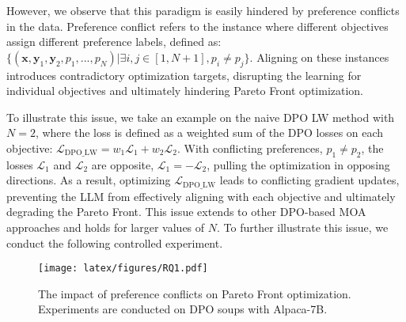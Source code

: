 However, we observe that this paradigm is easily hindered by preference conflicts in the data. 
Preference conflict refers to the instance where different objectives assign different preference labels, defined as:
$\{(\textbf{x}, \textbf{y}_1, \textbf{y}_2, p_1, ..., p_{N}) | \exists i, j \in [1, N+1],  p_i \neq p_j\}$. 
Aligning on these instances introduces contradictory optimization targets, disrupting the learning for individual objectives and ultimately hindering Pareto Front optimization. 

To illustrate this issue, we take an example on the naive DPO LW method with $N = 2$, where the loss is defined as a weighted sum of the DPO losses on each objective: $\mathcal{L}_{\mathrm{DPO\_LW}} = w_1 \mathcal{L}_1 + w_2 \mathcal{L}_2$. 
With conflicting preferences, \ie $p_1 \neq p_2$, the losses $\mathcal{L}_1$ and $\mathcal{L}_2$ are opposite, $\mathcal{L}_1 = - \mathcal{L}_2$, pulling the optimization in opposing directions. 
As a result, optimizing $\mathcal{L}_{\mathrm{DPO\_LW}}$ leads to conflicting gradient updates, preventing the LLM from effectively aligning with each objective and ultimately degrading the Pareto Front.
This issue extends to other DPO-based MOA approaches and holds for larger values of $N$. To further illustrate this issue, we conduct the following controlled experiment.

\begin{figure}[t]
 \setlength{\abovecaptionskip}{0.05cm}
 \setlength{\belowcaptionskip}{0cm}
    \centering
    \texttt{[image: latex/figures/RQ1.pdf]}
    \caption{The impact of preference conflicts on Pareto Front optimization. Experiments are conducted on DPO soups with Alpaca-7B. }
    \label{fig:RQ1}
\end{figure}

